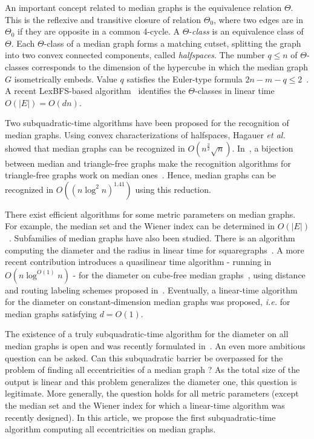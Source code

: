 \documentclass{article}
\newcommand{\card}[1]{\left| #1 \right|}
\begin{document}
An important concept related to median graphs is the equivalence relation $\Theta$. This is the reflexive and transitive closure of relation $\Theta_0$, where two edges are in $\Theta_0$ if they are opposite in a common 4-cycle. A $\Theta$-\textit{class} is an equivalence class of $\Theta$. Each $\Theta$-class of a median graph forms a matching cutset, splitting the graph into two convex connected components, called \textit{halfspaces}. The number $q \le n$ of $\Theta$-classes corresponds to the dimension of the hypercube in which the median graph $G$ isometrically embeds.  Value $q$ satisfies the Euler-type formula $2n-m-q\le 2$~\cite{KlMuSk98}. A recent LexBFS-based algorithm~\cite{BeChChVa20} identifies the $\Theta$-classes in linear time $O(\card{E})=O(dn)$.

Two subquadratic-time algorithms have been proposed for the recognition of median graphs. Using convex characterizations of halfspaces, Hagauer {\em et al.}~\cite{HaImKl99} showed that median graphs can be recognized in $O(n^{\frac{3}{2}}\sqrt{n})$. In~\cite{ImKlMu99}, a bijection between median and triangle-free graphs make the recognition algorithms for triangle-free graphs work on median ones~\cite{AlYuZw97}. Hence, median graphs can be recognized in $O((n\log^2 n)^{1.41})$ using this reduction.

There exist efficient algorithms for some metric parameters on median graphs. For example, the median set and the Wiener index can be determined in $O(\card{E})$~\cite{BeChChVa20}. 
Subfamilies of median graphs have also been studied. There is an algorithm computing the diameter and the radius in linear time for squaregraphs~\cite{ChDrVa02}. A more recent contribution introduces a quasilinear time algorithm - running in $O(n\log^{O(1)} n)$ - for the diameter on cube-free median graphs~\cite{Du20}, using distance and routing labeling schemes proposed in~\cite{ChLaRa19}. Eventually, a linear-time algorithm~\cite{BeHa21} for the diameter on constant-dimension median graphs was proposed, {\em i.e.} for median graphs satisfying $d=O(1)$.

The existence of a truly subquadratic-time algorithm for the diameter on all median graphs is open and was recently formulated in~\cite{BeChChVa20,Du20}. An even more ambitious question can be asked. Can this subquadratic barrier be overpassed for the problem of finding all eccentricities of a median graph ? As the total size of the output is linear and this problem generalizes the diameter one, this question is legitimate. More generally, the question holds for all metric parameters (except the median set and the Wiener index for which a linear-time algorithm was recently designed). In this article, we propose the first subquadratic-time algorithm computing all eccentricities on median graphs. 
\end{document}
